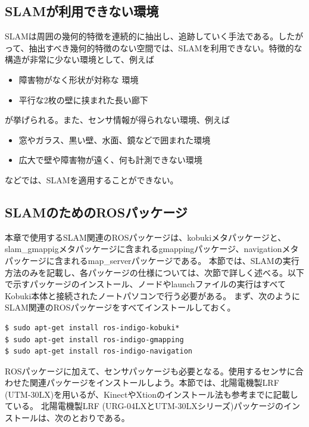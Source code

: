 \subsection{SLAMが利用できない環境}

SLAMは周囲の幾何的特徴を連続的に抽出し、追跡していく手法である。したがって、抽出すべき幾何的特徴のない空間では、SLAMを利用できない。特徴的な構造が非常に少ない環境として、例えば

\begin{itemize}
\item  障害物がなく形状が対称な  環境
\item 平行な2枚の壁に挟まれた長い廊下
\end{itemize}

が挙げられる。また、センサ情報が得られない環境、例えば

\begin{itemize}
\item 窓やガラス、黒い壁、水面、鏡などで囲まれた環境
\item 広大で壁や障害物が遠く、何も計測できない環境
\end{itemize}

などでは、SLAMを適用することができない。

\subsection{SLAMのためのROSパッケージ}

本章で使用するSLAM関連のROSパッケージは、kobukiメタパッケージと、slam\_gmappigメタパッケージに含まれるgmappingパッケージ、navigationメタパッケージに含まれるmap\_serverパッケージである。 本節では、SLAMの実行方法のみを記載し、各パッケージの仕様については、次節で詳しく述べる。以下で示すパッケージのインストール、ノードやlaunchファイルの実行はすべてKobuki本体と接続されたノートパソコンで行う必要がある。
まず、次のようにSLAM関連のROSパッケージをすべてインストールしておく。

\begin{lstlisting}[language=ROS]
$ sudo apt-get install ros-indigo-kobuki*
$ sudo apt-get install ros-indigo-gmapping
$ sudo apt-get install ros-indigo-navigation
\end{lstlisting}

ROSパッケージに加えて、センサパッケージも必要となる。使用するセンサに合わせた関連パッケージをインストールしよう。本節では、北陽電機製LRF (UTM-30LX)を用いるが、KinectやXtionのインストール法も参考までに記載している。
北陽電機製LRF (URG-04LXとUTM-30LXシリーズ)パッケージのインストールは、次のとおりである。

